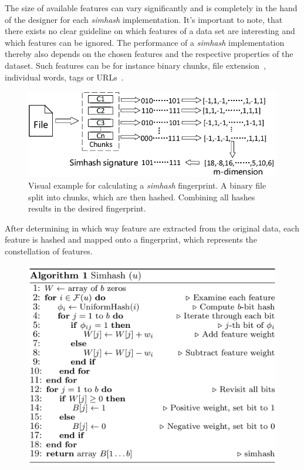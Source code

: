 \documentclass[12pt,a4paper,DIV=calc]{scrartcl}
\begin{document}
The size of available features can vary significantly and is completely in the hand of the designer for each \emph{simhash} implementation.
It's important to note, that there exists no clear guideline on which features of a data set are interesting and which features can be ignored.
The performance of a \emph{simhash} implementation thereby also depends on the chosen features and the respective properties of the dataset.
Such features can be for instance binary chunks, file extension~\cite{inproc:simhash}, individual words, tags or URLs~\cite{inproc:main}.

\begin{figure}[H]
\includegraphics[scale=0.5]{./gfx/binary_chunk_fingerprint}
\centering
\caption{Visual example for calculating a \emph{simhash} fingerprint.
A binary file split into chunks, which are then hashed.
Combining all hashes results in the desired fingerprint.~\cite{article:sampling-similarity}}\label{fig:simhash-example}
\end{figure}

After determining in which way feature are extracted from the original data, each feature is hashed and mapped onto a fingerprint, which represents the constellation of features.

\begin{figure}[H]
\includegraphics[scale=0.3]{./gfx/pseudocode.png}
\centering
\end{figure}
\end{document}
